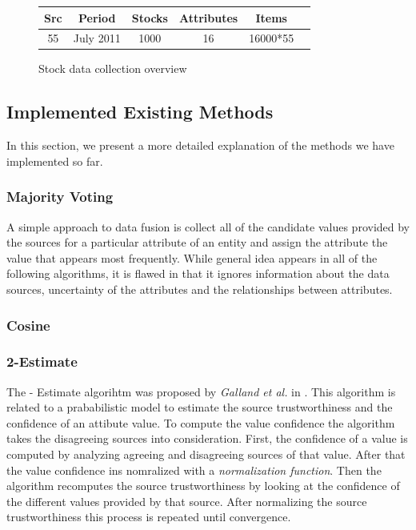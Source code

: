 \documentclass{acm_proc_article-sp}
\begin{document}
\begin{figure}[h]
    \centering
{%
\begin{tabular}{  | c | c | c | c  | c | c |}		
\hline
 \textbf{Src} & \textbf{Period} & \textbf{Stocks} & \textbf{Attributes}  & \textbf{Items}  \\
\hline
 55 & July 2011 &  1000 & 16 &  16000*55   \\
\hline
\end{tabular}
}
 \caption{Stock data collection overview}%
    \label{fig:stock}%
\end{figure}

\subsection{Implemented Existing Methods}

In this section, we present a more detailed explanation of the methods we have implemented so far. 

\subsubsection{Majority Voting}

A simple approach to data fusion is collect all of the candidate values provided by the sources for a particular attribute of an entity and assign the attribute the value that appears most frequently. While general idea appears in all of the following   algorithms,  it is flawed in that it ignores information about the data sources, uncertainty of the attributes and the relationships between  attributes.

\subsubsection{Cosine}

\subsubsection{2-Estimate}
The {- Estimate} algorihtm was proposed by \emph{Galland et al.} in \cite{galland:corro}. This algorithm is related to a prababilistic model to estimate the source trustworthiness and the confidence of an attibute value. To compute the value confidence the algorithm takes the disagreeing sources into consideration. First, the confidence of a value is computed by analyzing agreeing and disagreeing sources of that value. After that the value confidence ins nomralized with a \emph{normalization function}. Then the algorithm recomputes the source trustworthiness by looking at the confidence of the different values provided by that source. After normalizing the source trustworthiness this process is repeated until convergence.
\end{document}
